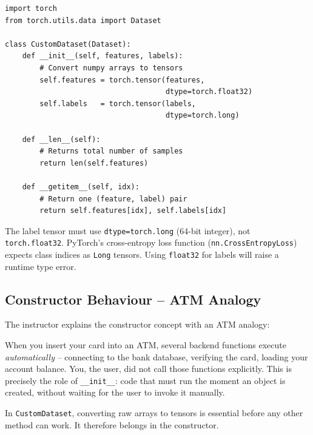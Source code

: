 \documentclass[12pt,a4paper]{article}
\begin{document}
\begin{tcolorbox}[colback=gray!5!white, colframe=gray!60!black,
  fonttitle=\bfseries, title=Listing 1: CustomDataset class]
\begin{verbatim}
import torch
from torch.utils.data import Dataset

class CustomDataset(Dataset):
    def __init__(self, features, labels):
        # Convert numpy arrays to tensors
        self.features = torch.tensor(features,
                                     dtype=torch.float32)
        self.labels   = torch.tensor(labels,
                                     dtype=torch.long)

    def __len__(self):
        # Returns total number of samples
        return len(self.features)

    def __getitem__(self, idx):
        # Return one (feature, label) pair
        return self.features[idx], self.labels[idx]
\end{verbatim}
\end{tcolorbox}

\begin{warningbox}
The label tensor must use \texttt{dtype=torch.long} (64-bit integer), not
\texttt{torch.float32}.  PyTorch's cross-entropy loss function
(\texttt{nn.CrossEntropyLoss}) expects class indices as \texttt{Long}
tensors.  Using \texttt{float32} for labels will raise a runtime type error.
\end{warningbox}

\subsection{Constructor Behaviour -- ATM Analogy}

The instructor explains the constructor concept with an ATM analogy:

\begin{example}[title=Constructor as ATM Card Insertion]
When you insert your card into an ATM, several backend functions execute
\emph{automatically} -- connecting to the bank database, verifying the card,
loading your account balance.  You, the user, did not call those functions
explicitly.  This is precisely the role of \texttt{\_\_init\_\_}: code that
must run the moment an object is created, without waiting for the user to
invoke it manually.

In \texttt{CustomDataset}, converting raw arrays to tensors is essential
before any other method can work.  It therefore belongs in the constructor.
\end{example}
\end{document}
